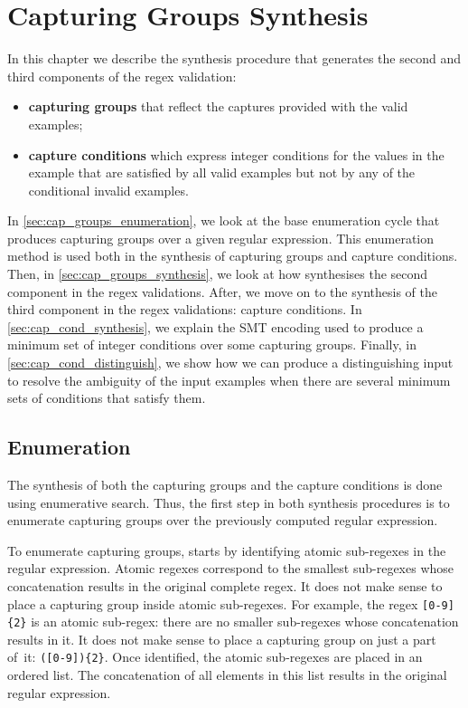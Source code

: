 \chapter{Capturing Groups Synthesis}\label{chap:capture-cond-synthesis}


In this chapter we describe the synthesis procedure that generates the second and third components of the regex validation:
\begin{itemize}
    \item \textbf{capturing groups} that reflect the captures provided with the valid examples;
    \item \textbf{capture conditions} which express integer conditions for the values in the example that are satisfied by all valid examples but not by any of the conditional invalid examples. 
\end{itemize}

In \autoref{sec:cap_groups_enumeration}, we look at the base enumeration cycle that produces capturing groups over a given regular expression. This enumeration method is used both in the synthesis of capturing groups and capture conditions. Then, in \autoref{sec:cap_groups_synthesis}, we look at how \Forest synthesises the second component in the regex validations. After, we move on to the synthesis of the third component in the regex validations: capture conditions. In \autoref{sec:cap_cond_synthesis}, we explain the SMT encoding used to produce a minimum set of integer conditions over some capturing groups. Finally, in \autoref{sec:cap_cond_distinguish}, we show how we can produce a distinguishing input to resolve the ambiguity of the input examples when there are several minimum sets of conditions that satisfy them.

    
\section{Enumeration}\label{sec:cap_groups_enumeration}
The synthesis of both the capturing groups and the capture conditions is done using enumerative search. Thus, the first step in both synthesis procedures is to enumerate capturing groups over the previously computed regular expression.

To enumerate capturing groups, \Forest starts by identifying atomic sub-regexes in the regular expression.
Atomic regexes correspond to the smallest sub-regexes whose concatenation results in the original complete regex.
It does not make sense to place a capturing group inside atomic sub-regexes. For example, the regex \verb![0-9]{2}! is an atomic sub-regex: there are no smaller sub-regexes whose concatenation results in it. It does not make sense to place a capturing group on just a part of~it: \verb!([0-9]){2}!.
Once identified, the atomic sub-regexes are placed in an ordered list. The concatenation of all elements in this list results in the original regular expression.


